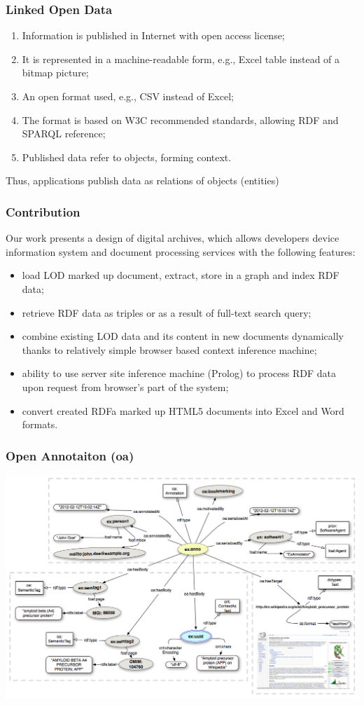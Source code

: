 \documentclass[10pt]{beamer}
\begin{document}
\begin{frame}
  \frametitle{Linked Open Data}
  \begin{enumerate}
  \item Information is published in Internet with open access license;
  \item It is represented in a machine-readable form, e.g., Excel table instead of a bitmap picture;
  \item An open format used, e.g., CSV instead of Excel;
  \item The format is based on W3C recommended standards, allowing RDF and SPARQL reference;
  \item Published data refer to objects, forming context.
  \end{enumerate}
  Thus, applications publish data as relations of objects (entities)
\end{frame}

\begin{frame}
  \frametitle{Contribution}
Our work presents a design of digital archives, which allows
developers device information system and document processing services
with the following features:
\begin{itemize}
\item load LOD marked up document, extract, store in a graph and index RDF data;
\item retrieve RDF data as triples or as a result of full-text search query;
\item combine existing LOD data and its content in new documents dynamically
  thanks to relatively simple browser based context inference machine;
\item ability to use server site inference machine (Prolog) to process RDF data upon
  request from browser's part of the system;
\item convert created RDFa marked up HTML5 documents into Excel and Word formats.
\end{itemize}
\end{frame}

\begin{frame}
  \frametitle{Open Annotaiton (oa)}
  \centering
  \includegraphics[width=1\linewidth]{Open-Annotation_CB_Bookmarking_and_Semantically_Tagging_A_webpage_spec20130128.png}

\end{frame}
\end{document}
